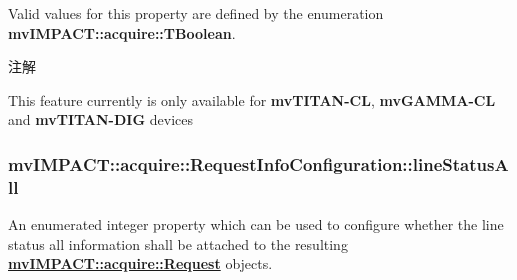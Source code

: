 Valid values for this property are defined by the enumeration {\bfseries mv\+I\+M\+P\+A\+C\+T\+::acquire\+::\+T\+Boolean}. \begin{DoxyNote}{注解}

\begin{DoxyItemize}
\item This feature currently is only available for {\bfseries mv\+T\+I\+T\+A\+N-\/\+C\+L}, {\bfseries mv\+G\+A\+M\+M\+A-\/\+C\+L} and {\bfseries mv\+T\+I\+T\+A\+N-\/\+D\+I\+G} devices 
\end{DoxyItemize}
\end{DoxyNote}
\hypertarget{classmv_i_m_p_a_c_t_1_1acquire_1_1_request_info_configuration_a816d920d6ef0144757984568b60d0064}{
\subsubsection[{line\+Status\+All}]{ mv\+I\+M\+P\+A\+C\+T\+::acquire\+::\+Request\+Info\+Configuration\+::line\+Status\+All}}\label{classmv_i_m_p_a_c_t_1_1acquire_1_1_request_info_configuration_a816d920d6ef0144757984568b60d0064}


An enumerated integer property which can be used to configure whether the line status all information shall be attached to the resulting {\bfseries \hyperlink{classmv_i_m_p_a_c_t_1_1acquire_1_1_request}{mv\+I\+M\+P\+A\+C\+T\+::acquire\+::\+Request}} objects. 

